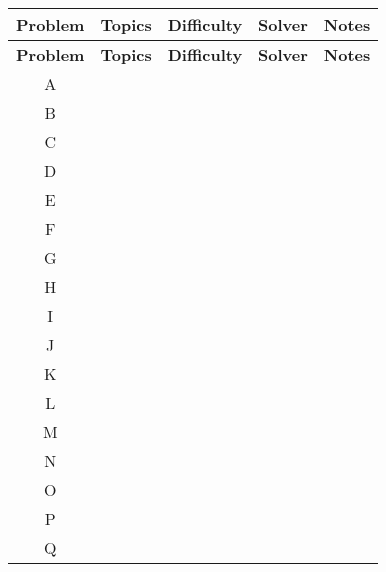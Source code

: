 \documentclass[10pt, a4paper, notitlepage]{report}
\begin{document}
	\begin{multicols*}{3}
	\end{multicols*}

\clearpage
\renewcommand{\arraystretch}{2} %
\begin{longtable}{|c|p{3.5cm}|c|c|p{9.5cm}|}
\hline\hline
\textbf{Problem} & \textbf{Topics} & \textbf{Difficulty} & \textbf{Solver} & \textbf{Notes} \\
\hline\hline
\endfirsthead %
\hline\hline
\textbf{Problem} & \textbf{Topics} & \textbf{Difficulty} & \textbf{Solver} & \textbf{Notes} \\
\hline\hline
\endhead
A & & & & \\
\hline
B & & & & \\
\hline
C & & & & \\
\hline
D & & & & \\
\hline
E & & & & \\
\hline
F & & & & \\
\hline
G & & & & \\
\hline
H & & & & \\
\hline
I & & & & \\
\hline
J & & & & \\
\hline
K & & & & \\
\hline
L & & & & \\
\hline
M & & & & \\
\hline
N & & & & \\
\hline
O & & & & \\
\hline
P & & & & \\
\hline
Q & & & & \\
\hline
\hline
\end{longtable}
\end{document}
